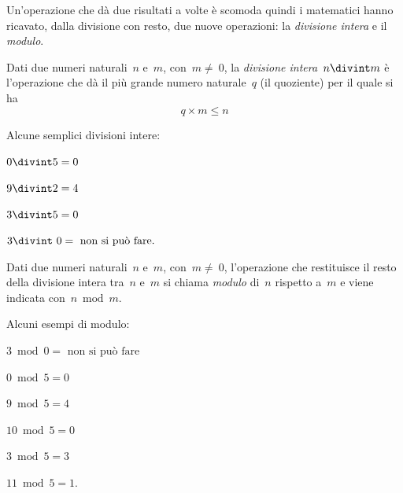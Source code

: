 Un'operazione che dà due risultati a volte è scomoda quindi i matematici 
hanno ricavato, dalla divisione con resto, due nuove operazioni: 
la \emph{divisione intera} e il \emph{modulo}.

\begin{definizione}
 Dati due numeri naturali~$n$ e~$m$, con~$m\neq~0$, la 
 \emph{divisione intera}~$n\divint m$ è l'operazione che dà il più grande 
 numero naturale~$q$ (il quoziente) per il quale si ha
$$q\times m\le n$$
\end{definizione}

\newpage

\begin{exrig}
 \begin{esempio}
 Alcune semplici divisioni intere:
 
\begin{multicols}{2}
$0 \divint 5=0$

$9 \divint 2=4$

$3\divint 5=0$

$3\divint~0=\text{ non si può fare.}$
\end{multicols}

 \end{esempio}
\end{exrig}

\begin{definizione}
 Dati due numeri naturali~$n$ e~$m$, con~$m\neq~0$, l'operazione che 
 restituisce il resto della divisione intera tra~$n$ e~$m$ si chiama 
 \emph{modulo} di~$n$ rispetto a~$m$ e viene indicata con~$n\bmod{m}$.
\end{definizione}

\begin{exrig}
 \begin{esempio}
 Alcuni esempi di modulo:
 
\begin{multicols}{2}
$3 \bmod 0= \text{ non si può fare}$

$0 \bmod 5= 0$

$9 \bmod 5 = 4$

$10 \bmod 5 = 0$

$3 \bmod 5 = 3$

$11 \bmod 5 = 1$.
\end{multicols}

 \end{esempio}
\end{exrig}


